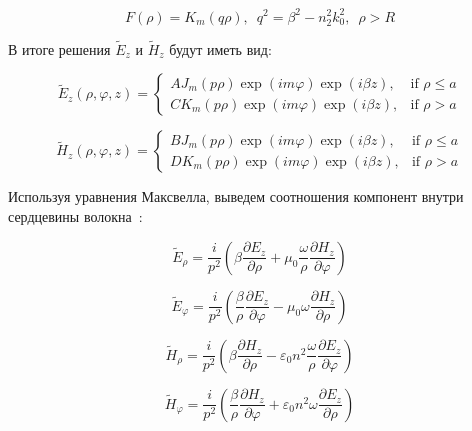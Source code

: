 \begin{equation}
	F(\rho) = K_m(q\rho), \,\,\, q^2 = \beta^2-n_2^2k_0^2, \,\,\, \rho > R
\end{equation}

В итоге решения $\widetilde{E}_z$ и $\widetilde{H}_z$ будут иметь вид:

\begin{equation}
	\widetilde{E}_z(\rho, \varphi, z) =
	\begin{cases}
		A J_m(p\rho)\exp{(im\varphi)}\exp{(i\beta z)}, & \text{if $\rho \leq a$} \\
		C K_m(p\rho)\exp{(im\varphi)}\exp{(i\beta z)}, & \text{if $\rho > a$}
	\end{cases}
\end{equation}

\begin{equation}
	\widetilde{H}_z(\rho, \varphi, z) =
	\begin{cases}
		B J_m(p\rho)\exp{(im\varphi)}\exp{(i\beta z)}, & \text{if $\rho \leq a$} \\
		D K_m(p\rho)\exp{(im\varphi)}\exp{(i\beta z)}, & \text{if $\rho > a$}
	\end{cases}
\end{equation}

Используя уравнения Максвелла, выведем соотношения компонент внутри сердцевины волокна~\cite{snyder1983optical}:

\begin{equation}
	\widetilde{E}_{\rho} = \frac{i}{p^2} \left( \beta \frac{\partial E_z}{\partial \rho} + \mu_0 \frac{\omega}{\rho} \frac{\partial H_z}{\partial \varphi} \right)
\end{equation}

\begin{equation}
	\widetilde{E}_{\varphi} = \frac{i}{p^2} \left( \frac{\beta}{\rho} \frac{\partial E_z}{\partial \varphi} - \mu_0 \omega \frac{\partial H_z}{\partial \rho} \right)
\end{equation}

\begin{equation}
	\widetilde{H}_{\rho} = \frac{i}{p^2} \left( \beta \frac{\partial H_z}{\partial \rho} - \varepsilon_0 n^2 \frac{\omega}{\rho} \frac{\partial E_z}{\partial \varphi} \right)
\end{equation}

\begin{equation}
	\widetilde{H}_{\varphi} = \frac{i}{p^2} \left( \frac{\beta}{\rho} \frac{\partial H_z}{\partial \varphi} + \varepsilon_0 n^2 \omega \frac{\partial E_z}{\partial \rho} \right)
\end{equation}

